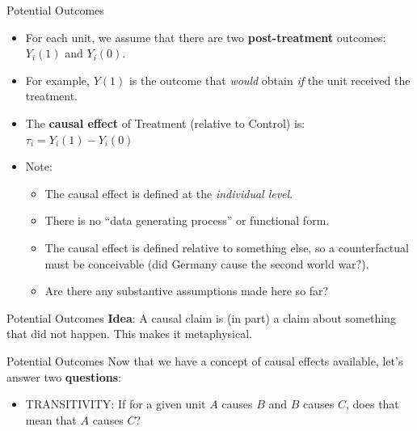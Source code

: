 \documentclass[
  11pt,
  ignorenonframetext,
]{beamer}
\providecommand{\tightlist}{%
  \setlength{\itemsep}{0pt}\setlength{\parskip}{0pt}}\usepackage{longtable,booktabs,array}
\begin{document}
\begin{frame}{Potential Outcomes}
\protect\hypertarget{potential-outcomes}{}
\begin{itemize}
\tightlist
\item
  For each unit, we assume that there are two \textbf{post-treatment}
  outcomes: \(Y_i(1)\) and \(Y_i(0)\).
\item
  For example, \(Y(1)\) is the outcome that \emph{would} obtain
  \emph{if} the unit received the treatment.
\item
  The \textbf{causal effect} of Treatment (relative to Control) is:
  \(\tau_i = Y_i(1) - Y_i(0)\)
\item
  Note:

  \begin{itemize}
  \tightlist
  \item
    The causal effect is defined at the \emph{individual level}.
  \item
    There is no ``data generating process'' or functional form.
  \item
    The causal effect is defined relative to something else, so a
    counterfactual must be conceivable (did Germany cause the second
    world war?).
  \item
    Are there any substantive assumptions made here so far?
  \end{itemize}
\end{itemize}
\end{frame}

\begin{frame}{Potential Outcomes}
\protect\hypertarget{potential-outcomes-1}{}
\textbf{Idea}: A causal claim is (in part) a claim about something that
did not happen. This makes it metaphysical.
\end{frame}

\begin{frame}{Potential Outcomes}
\protect\hypertarget{potential-outcomes-2}{}
Now that we have a concept of causal effects available, let's answer two
\textbf{questions}:

\begin{itemize}
\tightlist
\item
  TRANSITIVITY: If for a given unit \(A\) causes \(B\) and \(B\) causes
  \(C\), does that mean that \(A\) causes \(C\)?
\end{itemize}
\end{frame}
\end{document}
